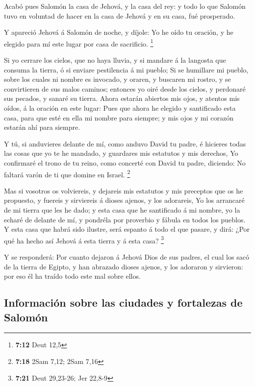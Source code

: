  Acabó pues Salomón la casa de Jehová, y la casa del rey: y
todo lo que Salomón tuvo en voluntad de hacer en la casa de Jehová y en
su casa, fué prosperado.

 Y apareció Jehová á Salomón de noche, y díjole: Yo he oído
tu oración, y he elegido para mí este lugar por casa de sacrificio.
\footnote{\textbf{7:12} Deut 12,5}

 Si yo cerrare los cielos, que no haya lluvia, y si mandare
á la langosta que consuma la tierra, ó si enviare pestilencia á mi
pueblo;  Si se humillare mi pueblo, sobre los cuales ni
nombre es invocado, y oraren, y buscaren mi rostro, y se convirtieren de
sus malos caminos; entonces yo oiré desde los cielos, y perdonaré sus
pecados, y sanaré su tierra.  Ahora estarán abiertos mis
ojos, y atentos mis oídos, á la oración en este lugar: 
Pues que ahora he elegido y santificado esta casa, para que esté en ella
mi nombre para siempre; y mis ojos y mi corazón estarán ahí para
siempre.

 Y tú, si anduvieres delante de mí, como anduvo David tu
padre, é hicieres todas las cosas que yo te he mandado, y guardares mis
estatutos y mis derechos,  Yo confirmaré el trono de tu
reino, como concerté con David tu padre, diciendo: No faltará varón de
ti que domine en Israel. \footnote{\textbf{7:18} 2Sam 7,12; 2Sam 7,16}

 Mas si vosotros os volviereis, y dejareis mis estatutos y
mis preceptos que os he propuesto, y fuereis y sirviereis á dioses
ajenos, y los adorareis,  Yo los arrancaré de mi tierra que
les he dado; y esta casa que he santificado á mi nombre, yo la echaré de
delante de mí, y pondréla por proverbio y fábula en todos los pueblos.
 Y esta casa que habrá sido ilustre, será espanto á todo el
que pasare, y dirá: ¿Por qué ha hecho así Jehová á esta tierra y á esta
casa? \footnote{\textbf{7:21} Deut 29,23-26; Jer 22,8-9}

 Y se responderá: Por cuanto dejaron á Jehová Dios de sus
padres, el cual los sacó de la tierra de Egipto, y han abrazado dioses
ajenos, y los adoraron y sirvieron: por eso él ha traído todo este mal
sobre ellos.

\hypertarget{informaciuxf3n-sobre-las-ciudades-y-fortalezas-de-salomuxf3n}{%
\subsection{Información sobre las ciudades y fortalezas de
Salomón}\label{informaciuxf3n-sobre-las-ciudades-y-fortalezas-de-salomuxf3n}}

